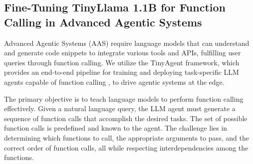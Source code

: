 




\subsection{Fine-Tuning TinyLlama 1.1B for Function Calling in Advanced Agentic Systems}

Advanced Agentic Systems (AAS) require language models that can understand and generate code snippets to integrate various tools and APIs, fulfilling user queries through function calling. We utilize the TinyAgent framework, which provides an end-to-end pipeline for training and deploying task-specific LLM agents capable of function calling \citep{tinyagent}, to drive agentic systems at the edge.

The primary objective is to teach language models to perform function calling effectively. Given a natural language query, the LLM agent must generate a sequence of function calls that accomplish the desired tasks. The set of possible function calls is predefined and known to the agent. The challenge lies in determining which functions to call, the appropriate arguments to pass, and the correct order of function calls, all while respecting interdependencies among the functions.

